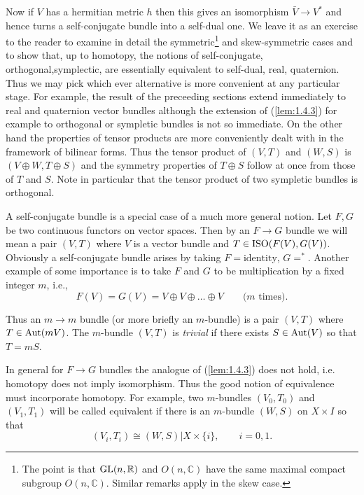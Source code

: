 Now if $V$ has a hermitian metric $h$ then this gives an isomorphism $\bar{V} \to V^*$ and hence turns a self-conjugate bundle into a self-dual one. We leave it as an exercise to the reader to examine in detail the symmetric\footnote{The point is that $\operatorname{GL}(n, \mathbb{R})$ and $O(n, \mathbb{C})$ have the same maximal compact subgroup $O(n, \mathbb{C})$. Similar remarks apply in the skew case.} and skew-symmetric cases and to show that, up to homotopy, the notions of self-conjugate, orthogonal,symplectic, are essentially equivalent to self-dual, real, quaternion. Thus we may pick which ever alternative is more convenient at any particular stage. For example, the result of the preceeding sections extend immediately to real and quaternion vector bundles although the extension of (\ref{lem:1.4.3}) for example to orthogonal or sympletic bundles is not so immediate. On the other hand the properties of tensor products are more conveniently dealt with in the framework of bilinear forms. Thus the tensor product of $(V, T)$ and $(W, S)$ is $(V \oplus W, T \oplus S)$ and the symmetry properties of $T \oplus S$ follow at once from those of $T$ and $S$. Note in particular that the tensor product of two sympletic bundles is orthogonal. \par \hfill

A self-conjugate bundle is a special case of a much more general notion. Let $F, G$ be two continuous functors on vector spaces. Then by an $F \to G$ bundle we will mean a pair $(V, T)$ where $V$ is a vector bundle and $T \in \operatorname{ISO}(F(V), G(V))$. Obviously a self-conjugate bundle arises by taking $F = \text{identity}$, $G = ^*$. Another example of some importance is to take $F$ and $G$ to be multiplication by a fixed integer $m$, i.e.,
\begin{equation*}
    F(V) = G(V) = V \oplus V \oplus \ldots \oplus V \qquad \text{($m$ times).}
\end{equation*}

Thus an $m \to m$ bundle (or more briefly an $m$-bundle) is a pair $(V, T)$ where $T \in \operatorname{Aut}(mV)$. The $m$-bundle $(V, T)$ is \textit{trivial} if there exists $S \in \operatorname{Aut}(V)$ so that $T = mS$. \par 

In general for $F \to G$ bundles the analogue of (\ref{lem:1.4.3}) does not hold, i.e. homotopy does not imply isomorphism. Thus the good notion of equivalence must incorporate homotopy. For example, two $m$-bundles $(V_0, T_0)$ and $(V_1, T_1)$ will be called equivalent if there is an $m$-bundle $(W, S)$ on $X \times I$ so that
\begin{equation*}
    (V_i, T_i) \cong (W, S) \vert X \times \{i\}, \qquad i = 0, 1.
\end{equation*}


